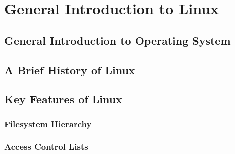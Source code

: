 \chapter{General Introduction to Linux}

\section{General Introduction to Operating System}

\section{A Brief History of Linux}

\section{Key Features of Linux}

\subsection{Filesystem Hierarchy}

\subsection{Access Control Lists}




